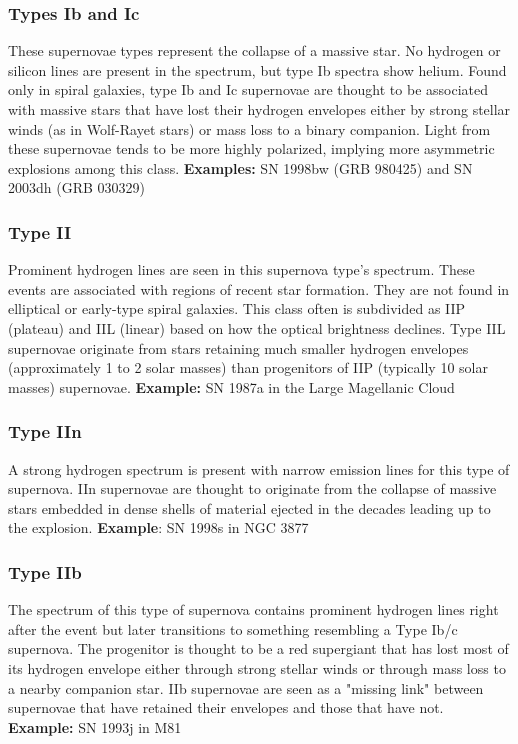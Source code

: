 \subsubsection{Types Ib and Ic}

These supernovae types represent the collapse of a massive star. No hydrogen or silicon lines are present in the spectrum, but type Ib spectra show helium. Found only in spiral galaxies, type Ib and Ic supernovae are thought to be associated with massive stars that have lost their hydrogen envelopes either by strong stellar winds (as in Wolf-Rayet stars) or mass loss to a binary companion. Light from these supernovae tends to be more highly polarized, implying more asymmetric explosions among this class. \textbf{Examples: }SN 1998bw (GRB 980425) and SN 2003dh (GRB 030329)

\subsubsection{Type II }

Prominent hydrogen lines are seen in this supernova type's spectrum. These events are associated with regions of recent star formation. They are not found in elliptical or early-type spiral galaxies. This class often is subdivided as IIP (plateau) and IIL (linear) based on how the optical brightness declines. Type IIL supernovae originate from stars retaining much smaller hydrogen envelopes (approximately 1 to 2 solar masses) than progenitors of IIP (typically 10 solar masses) supernovae. \textbf{Example:} SN 1987a in the Large Magellanic Cloud

\subsubsection{Type IIn}

A strong hydrogen spectrum is present with narrow emission lines for this type of supernova. IIn supernovae are thought to originate from the collapse of massive stars embedded in dense shells of material ejected in the decades leading up to the explosion. \textbf{Example}: SN 1998s in NGC 3877

\subsubsection{Type IIb}

The spectrum of this type of supernova contains prominent hydrogen lines right after the event but later transitions to something resembling a Type Ib/c supernova. The progenitor is thought to be a red supergiant that has lost most of its hydrogen envelope either through strong stellar winds or through mass loss to a nearby companion star. IIb supernovae are seen as a "missing link" between supernovae that have retained their envelopes and those that have not. \textbf{Example:} SN 1993j in M81



